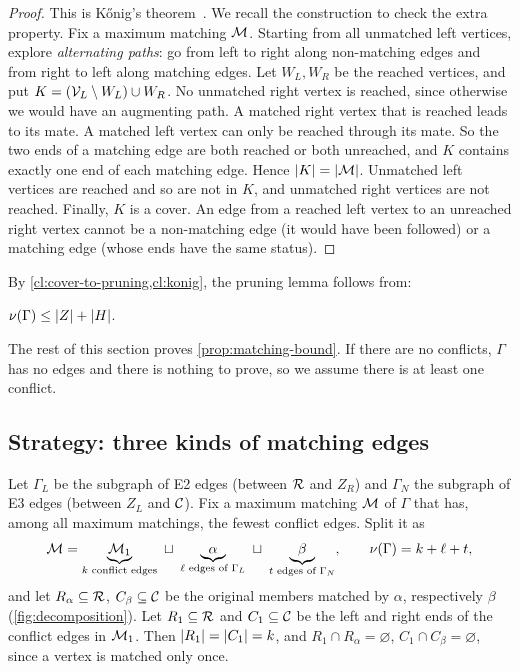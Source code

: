 \begin{proof}
This is K\H{o}nig's theorem~\cite{konig1931}. We recall the construction to
check the extra property. Fix a maximum matching $\mathcal M$. Starting from all
unmatched left vertices, explore \emph{alternating paths}: go from left to
right along non-matching edges and from right to left along matching
edges. Let $W_L,W_R$ be the reached vertices, and put
$K=(\mathcal V_L\setminus W_L)\cup W_R$.
No unmatched right vertex is reached, since otherwise we would have an
augmenting path. A matched right vertex that is reached leads to its mate.
A matched left vertex can only be reached through its mate. So the two
ends of a matching edge are both reached or both unreached, and $K$ contains
exactly one end of each matching edge. Hence $\lvert K\rvert=\lvert \mathcal M\rvert$. Unmatched left
vertices are reached and so are not in $K$, and unmatched right vertices are
not reached. Finally, $K$ is a cover. An edge from a reached left vertex to
an unreached right vertex cannot be a non-matching edge (it would have been
followed) or a matching edge (whose ends have the same status).
\end{proof}

By \cref{cl:cover-to-pruning,cl:konig}, the pruning lemma follows from:

\begin{proposition}\label{prop:matching-bound}
$\nu(\Gamma)\le\lvert Z\rvert+\lvert H\rvert$.
\end{proposition}

The rest of this section proves \cref{prop:matching-bound}. If there are no
conflicts, $\Gamma$ has no edges and there is nothing to prove, so we
assume there is at least one conflict.

\subsection{Strategy: three kinds of matching edges}\label{sec:strategy}

Let $\Gamma_L$ be the subgraph of E2 edges (between $\mathcal R$ and $Z_R$) and
$\Gamma_N$ the subgraph of E3 edges (between $Z_L$ and $\mathcal C$). Fix a maximum
matching $\mathcal M$ of $\Gamma$ that has, among all maximum matchings, the fewest
conflict edges. Split it as
\[
 \mathcal M=\underbrace{\mathcal M_1}_{k\text{ conflict edges}}\ \sqcup\ \underbrace{\alpha}_{\ell\text{ edges of }\Gamma_L}\ \sqcup\ \underbrace{\beta}_{t\text{ edges of }\Gamma_N},
 \qquad \nu(\Gamma)=k+\ell+t,
\]
and let $R_\alpha\subseteq\mathcal R$, $C_\beta\subseteq\mathcal C$ be the original members matched
by $\alpha$, respectively $\beta$ (\cref{fig:decomposition}). Let $R_1\subseteq\mathcal R$ and $C_1\subseteq\mathcal C$ be
the left and right ends of the conflict edges in $\mathcal M_1$. Then
$\lvert R_1\rvert=\lvert C_1\rvert=k$, and $R_1\cap R_\alpha=\varnothing$, $C_1\cap C_\beta=\varnothing$,
since a vertex is matched only once.

